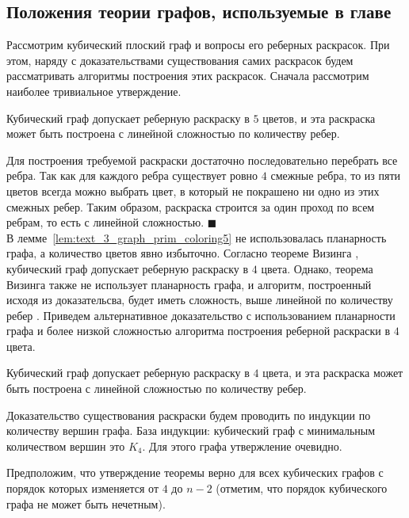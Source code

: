 \subsection{Положения теории графов, используемые в главе}

Рассмотрим кубический плоский граф и вопросы его реберных раскрасок.
При этом, наряду с доказательствами существования самих раскрасок будем рассматривать алгоритмы построения этих раскрасок.
Сначала рассмотрим наиболее тривиальное утверждение.

\begin{lemma}\label{lem:text_3_graph_prim_coloring5}
Кубический граф допускает реберную раскраску в $5$ цветов, и эта раскраска может быть построена с линейной сложностью по количеству ребер.
\end{lemma}
Для построения требуемой раскраски достаточно последовательно перебрать все ребра.
Так как для каждого ребра существует ровно $4$ смежные ребра, то из пяти цветов всегда можно выбрать цвет, в который не покрашено ни одно из этих смежных ребер.
Таким образом, раскраска строится за один проход по всем ребрам, то есть с линейной сложностью.
$\blacksquare$\\

В лемме~\ref{lem:text_3_graph_prim_coloring5} не использовалась планарность графа, а количество цветов явно избыточно.
Согласно теореме Визинга \cite{Vizing1964}, \cite{Vizing1965} кубический граф допускает реберную раскраску в $4$ цвета.
Однако, теорема Визинга также не использует планарность графа, и алгоритм, построенный исходя из доказательсва, будет иметь сложность, выше линейной по количеству ребер \cite{Soifer2009}.
Приведем альтернативное доказательство с использованием планарности графа и более низкой сложностью алгоритма построения реберной раскраски в $4$ цвета.

\begin{theorem}\label{thr:text_3_graph_prim_coloring4}
Кубический граф допускает реберную раскраску в $4$ цвета, и эта раскраска может быть построена с линейной сложностью по количеству ребер.
\end{theorem}

Доказательство существования раскраски будем проводить по индукции по количеству вершин графа.
База индукции: кубический граф с минимальным количеством вершин это $K_4$.
Для этого графа утвержление очевидно.

Предположим, что утверждение теоремы верно для всех кубических графов с порядок которых изменяется от $4$ до $n - 2$ (отметим, что порядок кубического графа не может быть нечетным).

